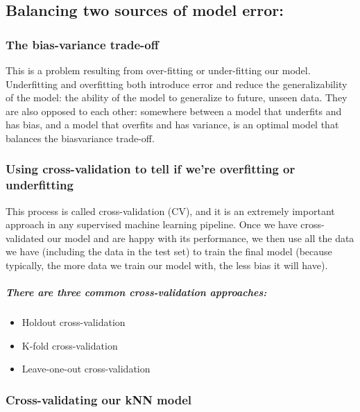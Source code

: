 \documentclass[
]{article}
\providecommand{\tightlist}{%
  \setlength{\itemsep}{0pt}\setlength{\parskip}{0pt}}
\begin{document}
\subsection{Balancing two sources of model
error:}\label{balancing-two-sources-of-model-error}

\subsubsection{The bias-variance
trade-off}\label{the-bias-variance-trade-off}

This is a problem resulting from over-fitting or under-fitting our
model. Underfitting and overfitting both introduce error and reduce the
generalizability of the model: the ability of the model to generalize to
future, unseen data. They are also opposed to each other: somewhere
between a model that underfits and has bias, and a model that overfits
and has variance, is an optimal model that balances the biasvariance
trade-off.

\subsubsection{Using cross-validation to tell if we're overfitting or
underfitting}\label{using-cross-validation-to-tell-if-were-overfitting-or-underfitting}

This process is called cross-validation (CV), and it is an extremely
important approach in any supervised machine learning pipeline. Once we
have cross-validated our model and are happy with its performance, we
then use all the data we have (including the data in the test set) to
train the final model (because typically, the more data we train our
model with, the less bias it will have).

\subparagraph{There are three common cross-validation
approaches:}\label{there-are-three-common-cross-validation-approaches}

\begin{itemize}
\tightlist
\item
  Holdout cross-validation
\item
  K-fold cross-validation
\item
  Leave-one-out cross-validation
\end{itemize}

\subsubsection{Cross-validating our kNN
model}\label{cross-validating-our-knn-model}
\end{document}

